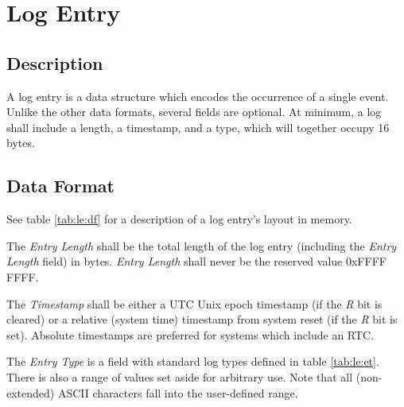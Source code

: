\documentclass[paper=letter, fontsize=10pt]{scrartcl} %
\numberwithin{equation}{section} %
\numberwithin{figure}{section} %
\numberwithin{table}{section} %
\begin{document}
\section{Log Entry} \label{sec:le}

\subsection{Description} \label{sec:le:desc}

A log entry is a data structure which encodes the occurrence of a single event.
Unlike the other data formats, several fields are optional. At minimum, a log
shall include a length, a timestamp, and a type, which will together occupy 16
bytes.

\subsection{Data Format} \label{sec:le:df}

See table \ref{tab:le:df} for a description of a log entry's layout in memory.

The \emph{Entry Length} shall be the total length of the log entry (including
the \emph{Entry Length} field) in bytes. \emph{Entry Length} shall never be the
reserved value 0xFFFF FFFF.

The \emph{Timestamp} shall be either a UTC Unix epoch timestamp (if the \emph{R}
bit is cleared) or a relative (system time) timestamp from system reset (if the
\emph{R} bit is set). Absolute timestamps are preferred for systems which
include an RTC.

The \emph{Entry Type} is a field with standard log types defined in table
\ref{tab:le:et}. There is also a range of values set aside for arbitrary use.
Note that all (non-extended) ASCII characters fall into the user-defined range.
\end{document}
